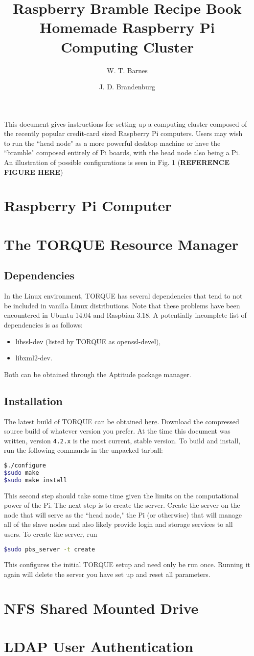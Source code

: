 \documentclass[12pt,preprint]{aastex}
\begin{document}
\title{Raspberry Bramble Recipe Book\\ Homemade Raspberry Pi Computing Cluster}
\author{W. T. Barnes \and J. D. Brandenburg}

This document gives instructions for setting up a computing cluster composed of the recently popular credit-card sized Raspberry Pi computers. Users may wish to run the ``head node" as a more powerful desktop machine or have the ``bramble" composed entirely of Pi boards, with the head node also being a Pi. An illustration of possible configurations is seen in Fig. 1 ({\bf REFERENCE FIGURE HERE})
\section{Raspberry Pi Computer}
\section{The TORQUE Resource Manager}
\subsection{Dependencies}
In the Linux environment, TORQUE has several dependencies that tend to not be included in vanilla Linux distributions. Note that these problems have been encountered in Ubuntu 14.04 and Raspbian 3.18. A potentially incomplete list of dependencies is as follows:
\begin{itemize}
\item libssl-dev (listed by TORQUE as openssl-devel),
\item libxml2-dev.
\end{itemize}
Both can be obtained through the Aptitude package manager.
\subsection{Installation}
The latest build of TORQUE can be obtained \href{http://www.adaptivecomputing.com/products/open-source/torque/}{here}. Download the compressed source build of whatever version you prefer. At the time this document was written, version \texttt{4.2.x} is the most current, stable version. To build and install, run the following commands in the unpacked tarball:
\begin{lstlisting}[frame=single,language=bash]
$./configure 
$sudo make 
$sudo make install
\end{lstlisting}
This second step should take some time given the limits on the computational power of the Pi. The next step is to create the server. Create the server on the node that will serve as the ``head node," the Pi (or otherwise) that will manage all of the slave nodes and also likely provide login and storage services to all users. To create the server, run
\begin{lstlisting}[frame=single,language=bash]
$sudo pbs_server -t create
\end{lstlisting} 
This configures the initial TORQUE setup and need only be run once. Running it again will delete the server you have set up and reset all parameters.
\section{NFS Shared Mounted Drive}
\section{LDAP User Authentication}
\end{document}
